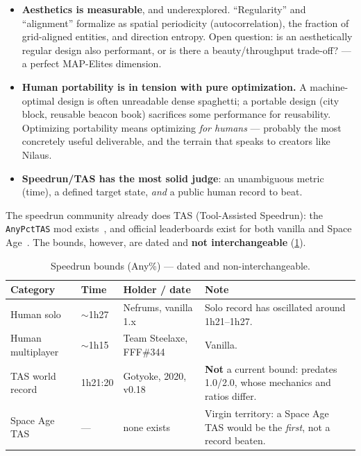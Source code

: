 \documentclass[11pt,a4paper]{article}
\begin{document}
\begin{itemize}
\item \textbf{Aesthetics is measurable}, and underexplored. ``Regularity'' and
  ``alignment'' formalize as spatial periodicity (autocorrelation), the fraction
  of grid-aligned entities, and direction entropy. Open question: is an
  aesthetically regular design also performant, or is there a beauty/throughput
  trade-off? --- a perfect MAP-Elites dimension.
\item \textbf{Human portability is in tension with pure optimization.} A
  machine-optimal design is often unreadable dense spaghetti; a portable design
  (city block, reusable beacon book) sacrifices some performance for reusability.
  Optimizing portability means optimizing \emph{for humans} --- probably the most
  concretely useful deliverable, and the terrain that speaks to creators like
  Nilaus.
\item \textbf{Speedrun/TAS has the most solid judge}: an unambiguous metric
  (time), a defined target state, \emph{and} a public human record to beat.
\end{itemize}

The speedrun community already does TAS (Tool-Assisted Speedrun): the
\texttt{AnyPctTAS} mod exists~\cite{anypcttas}, and official leaderboards exist
for both vanilla and Space Age~\cite{speedrun_factorio,speedrun_spaceage}. The
bounds, however, are dated and \textbf{not interchangeable}
(\cref{tab:speedrun}).

\begin{table}[htbp]
\centering
\caption{Speedrun bounds (Any\%) --- dated and non-interchangeable.}
\label{tab:speedrun}
\small
\begin{tabularx}{\textwidth}{@{}l l l X@{}}
\toprule
\textbf{Category} & \textbf{Time} & \textbf{Holder / date} & \textbf{Note}\\
\midrule
Human solo        & ${\sim}$1h27 & Nefrums, vanilla 1.x~\cite{speedrun_nefrums}
  & Solo record has oscillated around 1h21--1h27.\\
Human multiplayer & ${\sim}$1h15 & Team Steelaxe, FFF\#344~\cite{fff344}
  & Vanilla.\\
TAS world record  & 1h21:20 & Gotyoke, 2020, v0.18~\cite{tas_wr_2020}
  & \textbf{Not} a current bound: predates 1.0/2.0, whose mechanics and ratios differ.\\
Space Age TAS     & --- & none exists~\cite{speedrun_spaceage}
  & Virgin territory: a Space Age TAS would be the \emph{first}, not a record beaten.\\
\bottomrule
\end{tabularx}
\end{table}
\end{document}
